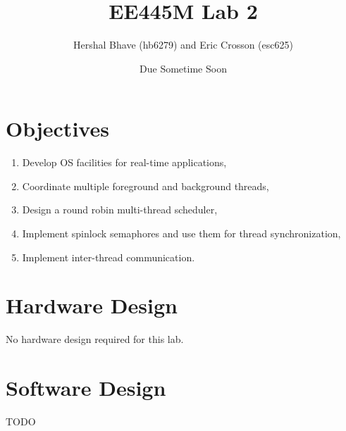 \documentclass[12pt]{article}
\title{EE445M Lab 2}
\author{Hershal Bhave (hb6279) and Eric Crosson (esc625)}
\date{Due Sometime Soon}
\begin{document}
\maketitle

\section{Objectives}
\begin{enumerate}
\item Develop OS facilities for real-time applications,
\item Coordinate multiple foreground and background threads,
\item Design a round robin multi-thread scheduler,
\item Implement spinlock semaphores and use them for thread synchronization,
\item Implement inter-thread communication.
\end{enumerate}

\section{Hardware Design}
No hardware design required for this lab.

\section{Software Design}
{\huge \color{red} TODO}
\end{document}
